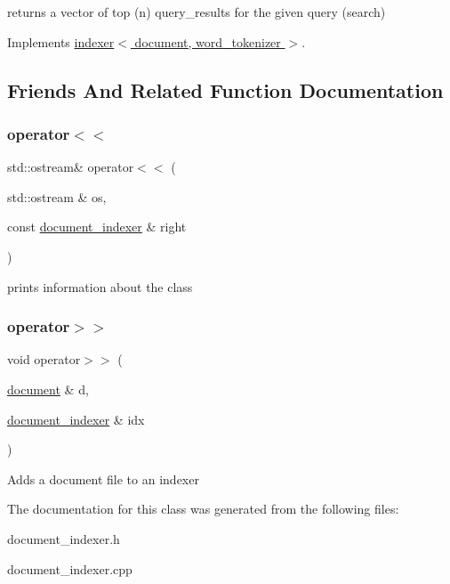 returns a vector of top (n) query\+\_\+results for the given query (search) 

Implements \hyperlink{classindexer_a9a7679edcc3114613dac13b688c0e4b2}{indexer$<$ document, word\+\_\+tokenizer $>$}.



\subsection{Friends And Related Function Documentation}
\mbox{\label{classdocument__indexer_aa6925b3d886b1c21f2138ded7b5b05dc}} 
\subsubsection{\texorpdfstring{operator$<$$<$}{operator<<}}
{\footnotesize\ttfamily std\+::ostream\& operator$<$$<$ (\begin{DoxyParamCaption}\item[{std\+::ostream \&}]{os,  }\item[{const \hyperlink{classdocument__indexer}{document\+\_\+indexer} \&}]{right }\end{DoxyParamCaption})\hspace{0.3cm}{\ttfamily [friend]}}

prints information about the class \mbox{\label{classdocument__indexer_ad495ee25cb53dba20e9c8de1d0ce22e4}} 
\subsubsection{\texorpdfstring{operator$>$$>$}{operator>>}}
{\footnotesize\ttfamily void operator$>$$>$ (\begin{DoxyParamCaption}\item[{\hyperlink{classdocument}{document} \&}]{d,  }\item[{\hyperlink{classdocument__indexer}{document\+\_\+indexer} \&}]{idx }\end{DoxyParamCaption})\hspace{0.3cm}{\ttfamily [friend]}}

Adds a document file to an indexer 

The documentation for this class was generated from the following files\+:\begin{DoxyCompactItemize}
\item 
document\+\_\+indexer.\+h\item 
document\+\_\+indexer.\+cpp\end{DoxyCompactItemize}
